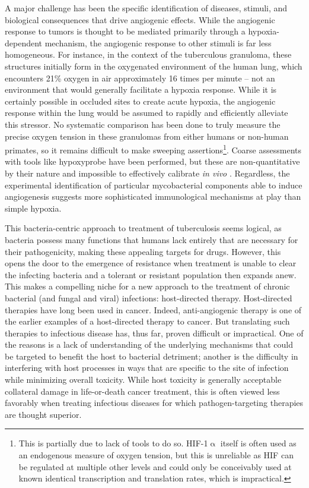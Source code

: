 A major challenge has been the specific identification of diseases, stimuli, and biological consequences that drive angiogenic effects. While the angiogenic response to tumors is thought to be mediated primarily through a hypoxia\hyp{}dependent mechanism, the angiogenic response to other stimuli is far less homogeneous. For instance, in the context of the tuberculous granuloma, these structures initially form in the oxygenated environment of the human lung, which encounters 21\% oxygen in air approximately 16 times per minute -- not an environment that would generally facilitate a hypoxia response. While it is certainly possible in occluded sites to create acute hypoxia, the angiogenic response within the lung would be assumed to rapidly and efficiently alleviate this stressor. No systematic comparison has been done to truly measure the precise oxygen tension in these granulomas from either humans or non\hyp{}human primates, so it remains difficult to make sweeping assertions\footnote{This is partially due to lack of tools to do so. HIF-1$\upalpha$ itself is often used as an endogenous measure of oxygen tension, but this is unreliable as HIF can be regulated at multiple other levels and could only be conceivably used at known identical transcription and translation rates, which is impractical.}. Coarse assessments with tools like hypoxyprobe have been performed, but these are non\hyp{}quantitative by their nature and impossible to effectively calibrate \textit{in vivo} \citep{Cousins2016}. Regardless, the experimental identification of particular mycobacterial components able to induce angiogenesis suggests more sophisticated immunological mechanisms at play than simple hypoxia.

This bacteria\hyp{}centric approach to treatment of tuberculosis seems logical, as bacteria possess many functions that humans lack entirely that are necessary for their pathogenicity, making these appealing targets for drugs. However, this opens the door to the emergence of resistance when treatment is unable to clear the infecting bacteria and a tolerant or resistant population then expands anew. This makes a compelling niche for a new approach to the treatment of chronic bacterial (and fungal and viral) infections: host\hyp{}directed therapy. Host\hyp{}directed therapies have long been used in cancer. Indeed, anti\hyp{}angiogenic therapy is one of the earlier examples of a host\hyp{}directed therapy to cancer. But translating such therapies to infectious disease has, thus far, proven difficult or impractical. One of the reasons is a lack of understanding of the underlying mechanisms that could be targeted to benefit the host to bacterial detriment; another is the difficulty in interfering with host processes in ways that are specific to the site of infection while minimizing overall toxicity. While host toxicity is generally acceptable collateral damage in life-or-death cancer treatment, this is often viewed less favorably when treating infectious diseases for which pathogen\hyp{}targeting therapies are thought superior. 

